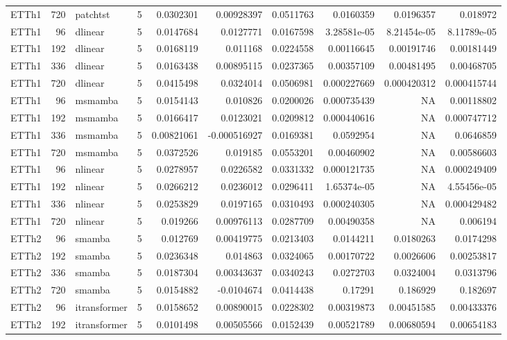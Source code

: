 \begin{longtable}{lrllrrrrrr}
ETTh1 & 720 & patchtst & 5 & 0.0302301 & 0.00928397 & 0.0511763 & 0.0160359 & 0.0196357 & 0.018972 \\
ETTh1 & 96 & dlinear & 5 & 0.0147684 & 0.0127771 & 0.0167598 & 3.28581e-05 & 8.21454e-05 & 8.11789e-05 \\
ETTh1 & 192 & dlinear & 5 & 0.0168119 & 0.011168 & 0.0224558 & 0.00116645 & 0.00191746 & 0.00181449 \\
ETTh1 & 336 & dlinear & 5 & 0.0163438 & 0.00895115 & 0.0237365 & 0.00357109 & 0.00481495 & 0.00468705 \\
ETTh1 & 720 & dlinear & 5 & 0.0415498 & 0.0324014 & 0.0506981 & 0.000227669 & 0.000420312 & 0.000415744 \\
ETTh1 & 96 & msmamba & 5 & 0.0154143 & 0.010826 & 0.0200026 & 0.000735439 & NA & 0.00118802 \\
ETTh1 & 192 & msmamba & 5 & 0.0166417 & 0.0123021 & 0.0209812 & 0.000440616 & NA & 0.000747712 \\
ETTh1 & 336 & msmamba & 5 & 0.00821061 & -0.000516927 & 0.0169381 & 0.0592954 & NA & 0.0646859 \\
ETTh1 & 720 & msmamba & 5 & 0.0372526 & 0.019185 & 0.0553201 & 0.00460902 & NA & 0.00586603 \\
ETTh1 & 96 & nlinear & 5 & 0.0278957 & 0.0226582 & 0.0331332 & 0.000121735 & NA & 0.000249409 \\
ETTh1 & 192 & nlinear & 5 & 0.0266212 & 0.0236012 & 0.0296411 & 1.65374e-05 & NA & 4.55456e-05 \\
ETTh1 & 336 & nlinear & 5 & 0.0253829 & 0.0197165 & 0.0310493 & 0.000240305 & NA & 0.000429482 \\
ETTh1 & 720 & nlinear & 5 & 0.019266 & 0.00976113 & 0.0287709 & 0.00490358 & NA & 0.006194 \\
ETTh2 & 96 & smamba & 5 & 0.012769 & 0.00419775 & 0.0213403 & 0.0144211 & 0.0180263 & 0.0174298 \\
ETTh2 & 192 & smamba & 5 & 0.0236348 & 0.014863 & 0.0324065 & 0.00170722 & 0.0026606 & 0.00253817 \\
ETTh2 & 336 & smamba & 5 & 0.0187304 & 0.00343637 & 0.0340243 & 0.0272703 & 0.0324004 & 0.0313796 \\
ETTh2 & 720 & smamba & 5 & 0.0154882 & -0.0104674 & 0.0414438 & 0.17291 & 0.186929 & 0.182697 \\
ETTh2 & 96 & itransformer & 5 & 0.0158652 & 0.00890015 & 0.0228302 & 0.00319873 & 0.00451585 & 0.00433376 \\
ETTh2 & 192 & itransformer & 5 & 0.0101498 & 0.00505566 & 0.0152439 & 0.00521789 & 0.00680594 & 0.00654183 \\

\end{longtable}
